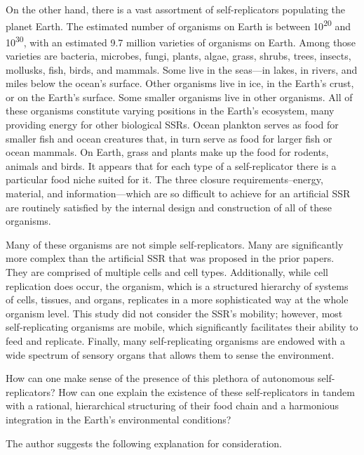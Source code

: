 On the other hand, there is a vast assortment of
self-replicators populating the planet Earth. The estimated number of
organisms on Earth is between 10\textsuperscript{20} and
10\textsuperscript{30}, with an estimated 9.7 million varieties of
organisms on Earth. Among those varieties are bacteria, microbes,
fungi, plants, algae, grass, shrubs, trees, insects, mollusks, fish,
birds, and mammals. Some live in the seas---in 
lakes,  in rivers, and miles below the ocean's surface. Other
organisms live in ice, in the Earth’s crust, or on the Earth’s surface.
Some smaller organisms live in other organisms. 
All of these organisms constitute varying positions in the Earth's ecosystem, 
many providing energy for other biological SSRs.
Ocean
plankton serves as food for smaller fish and ocean creatures that, in
turn serve as food for larger fish or ocean mammals. On Earth, grass
and plants make up the food for rodents, animals and birds. It appears
that for each type of a self-replicator there is a particular food
niche suited for it. 
The three closure requirements--energy, material, and information---which 
are so difficult to achieve for an artificial SSR are routinely satisfied 
by the internal design and construction of all of these organisms.

Many of these organisms are not simple self-replicators. Many are significantly more complex than the artificial SSR  that was proposed in the prior papers. They are comprised of multiple cells and cell types. Additionally, while cell replication does occur, the organism, which is a structured hierarchy of systems of cells, tissues, and organs, replicates in a more sophisticated way at the whole organism level. This study did not consider the SSR’s mobility; however, most self-replicating organisms are mobile, which significantly facilitates their ability to feed and replicate. Finally, many self-replicating organisms are endowed with a wide spectrum of sensory organs that allows them to sense the environment.

How can one make sense of the presence of this plethora of
autonomous self-replicators? How can one explain the
existence of these self-replicators in tandem with a rational, hierarchical
structuring of their food chain and a harmonious integration in the
Earth’s environmental conditions?

The author suggests the following explanation for
consideration.

